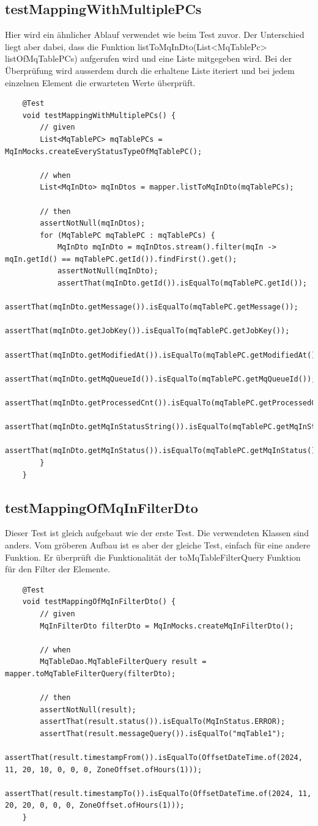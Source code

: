 \subsection{testMappingWithMultiplePCs}
Hier wird ein ähnlicher Ablauf verwendet wie beim Test zuvor. Der Unterschied liegt aber dabei, dass die Funktion listToMqInDto(List<MqTablePc> listOfMqTablePCs) aufgerufen wird und eine Liste mitgegeben wird. Bei der Überprüfung wird ausserdem durch die erhaltene Liste iteriert und bei jedem einzelnen Element die erwarteten Werte überprüft.

\begin{verbatim}
	@Test
	void testMappingWithMultiplePCs() {
		// given
		List<MqTablePC> mqTablePCs = MqInMocks.createEveryStatusTypeOfMqTablePC();
		
		// when
		List<MqInDto> mqInDtos = mapper.listToMqInDto(mqTablePCs);
		
		// then
		assertNotNull(mqInDtos);
		for (MqTablePC mqTablePC : mqTablePCs) {
			MqInDto mqInDto = mqInDtos.stream().filter(mqIn -> mqIn.getId() == mqTablePC.getId()).findFirst().get();
			assertNotNull(mqInDto);
			assertThat(mqInDto.getId()).isEqualTo(mqTablePC.getId());
			assertThat(mqInDto.getMessage()).isEqualTo(mqTablePC.getMessage());
			assertThat(mqInDto.getJobKey()).isEqualTo(mqTablePC.getJobKey());
			assertThat(mqInDto.getModifiedAt()).isEqualTo(mqTablePC.getModifiedAt());
			assertThat(mqInDto.getMqQueueId()).isEqualTo(mqTablePC.getMqQueueId());
			assertThat(mqInDto.getProcessedCnt()).isEqualTo(mqTablePC.getProcessedCnt());
			assertThat(mqInDto.getMqInStatusString()).isEqualTo(mqTablePC.getMqInStatusString());
			assertThat(mqInDto.getMqInStatus()).isEqualTo(mqTablePC.getMqInStatus());
		}
	}
\end{verbatim}

\subsection{testMappingOfMqInFilterDto}
Dieser Test ist gleich aufgebaut wie der erste Test. Die verwendeten Klassen sind anders. Vom gröberen Aufbau ist es aber der gleiche Test, einfach für eine andere Funktion. Er überprüft die Funktionalität der toMqTableFilterQuery Funktion für den Filter der Elemente.

\begin{verbatim}
	@Test
	void testMappingOfMqInFilterDto() {
		// given
		MqInFilterDto filterDto = MqInMocks.createMqInFilterDto();
		
		// when
		MqTableDao.MqTableFilterQuery result = mapper.toMqTableFilterQuery(filterDto);
		
		// then
		assertNotNull(result);
		assertThat(result.status()).isEqualTo(MqInStatus.ERROR);
		assertThat(result.messageQuery()).isEqualTo("mqTable1");
		assertThat(result.timestampFrom()).isEqualTo(OffsetDateTime.of(2024, 11, 20, 10, 0, 0, 0, ZoneOffset.ofHours(1)));
		assertThat(result.timestampTo()).isEqualTo(OffsetDateTime.of(2024, 11, 20, 20, 0, 0, 0, ZoneOffset.ofHours(1)));
	}
\end{verbatim}

